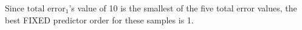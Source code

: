 \par
\noindent
Since $\text{total error}_1$'s value of 10 is the smallest of the five
total error values,
the best FIXED predictor order for these samples is 1.




